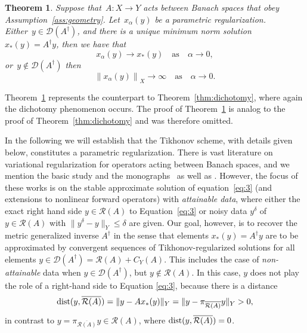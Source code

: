 \documentclass[12pt]{amsart}
\newcommand{\norm}[2]{\left\|#1\right\|_{#2}}
\newcommand{\domain}{\mathcal D}
\newcommand{\range}{\mathcal R}
\newcommand{\Ad}{A^\dag}
\newtheorem{theorem}{Theorem}
\theoremstyle{remark}
\begin{document}
\begin{theorem} \label{thm:Parathm}
    Suppose that~$A \colon X \to Y$ acts between Banach spaces that obey Assumption~\ref{ass:geometry}. Let~$x_\alpha(y)$ be a parametric regularization.\\
  Either~$y\in \domain(\Ad)$,  and there is a unique minimum norm solution $x_*(y)=A^\dagger y$, then we have that 
  \begin{equation} \label{eq:normcon-dichotomy}
   x_\alpha(y) \longrightarrow x_*(y) \quad \mbox{as} \quad \alpha \to 0,
  \end{equation}  
  or~$y\not\in \domain(\Ad)$ then 
  \begin{equation}\label{eq:normdiv}
      \norm{x_\alpha(y)}{X} \to \infty\quad \text{as}\quad \alpha\to 0.
  \end{equation}
\end{theorem}

\medskip

Theorem~\ref{thm:Parathm} represents the counterpart to Theorem~\ref{thm:dichotomy}, where again the dichotomy phenomenon occurs. The proof of Theorem~\ref{thm:Parathm} is analog to the proof of Theorem~\ref{thm:dichotomy} and was therefore omitted.

\medskip

In the following we will establish that the Tikhonov scheme, with details given below,  constitutes a parametric regularization.
There is vast literature on variational regularization for operators
acting between Banach spaces, and we mention the basic study \cite{HKPS07} and the monographs~\cite{MR2963507} as well as \cite{Scherzerbuch09}. However, the focus of these works is on the stable approximate solution of equation~\eqref{eq:3} (and extensions to nonlinear forward operators) with \emph{attainable data}, where either the exact right hand side $y \in \range(A)$ to Equation~\eqref{eq:3} or noisy data $y^\delta$ of $y \in \range(A)$ with $\|y^\delta-y\|_Y \le \delta$ are given.  Our goal, however, is to recover
the metric generalized inverse $A^\dagger$ in the sense that elements $x_*(y)=A^\dagger y$ are to be approximated by convergent sequences of Tikhonov-regularized solutions for all elements $y \in \domain(A^\dagger)=\range(A)+C_Y(A)$.
This includes the case of \emph{non-attainable} data when $y \in \domain(A^\dagger)$, but $y \notin \range (A)$.
In this case, $y$ does not play the role of a right-hand side to Equation \eqref{eq:3}, because there is a distance
$${\rm dist}(y,\overline{\range(A)})=\|y-Ax_*(y)\|_Y=\|y-\pi_{\overline{\range(A)}} y\|_Y>0,$$
in contrast to $y =\pi_{\overline{\range(A)}} y\in \range(A)$, where ${\rm dist}(y,\overline{\range(A)})=0$.
\end{document}
